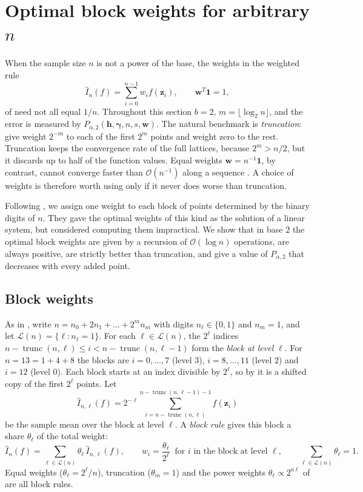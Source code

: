 \documentclass[preprint,12pt,authoryear]{elsarticle}
\begin{document}
 

\section{Optimal block weights for arbitrary $n$}\label{sec:bw}

When the sample size $n$ is not a power of the base, the weights in the
weighted rule
\[
 \widehat I_n(f)=\sum_{i=0}^{n-1}w_if(\boldsymbol z_i),\qquad
 \boldsymbol w^T\boldsymbol 1=1,
\]
of \citet[Section~5.1]{MDH26} need not all equal $1/n$. Throughout this
section $b=2$, $m=\lfloor\log_2n\rfloor$, and the error is measured by
$P_{\alpha,2}(\boldsymbol h,\boldsymbol\gamma,n,s,\boldsymbol w)$. The
natural benchmark is \emph{truncation}: give weight $2^{-m}$ to each of the
first $2^m$ points and weight zero to the rest. Truncation keeps
the convergence rate of the full lattices, because $2^m>n/2$, but it
discards up to half of the function values. Equal weights
$\boldsymbol w=n^{-1}\boldsymbol 1$, by contrast, cannot converge faster
than $\mathcal O(n^{-1})$ along a sequence \citep[Proposition~1]{HKKN12}. A
choice of weights is therefore worth using only if it never does worse than
truncation.

Following \citet{HKKN12}, we assign one weight to each block of points
determined by the binary digits of $n$. They gave the optimal weights of
this kind as the solution of a linear system, but considered computing them
impractical. We show that in base $2$ the optimal block weights are given by
a recursion of $\mathcal O(\log n)$ operations, are always positive, are
strictly better than truncation, and give a value of $P_{\alpha,2}$ that
decreases with every added point.

\subsection{Block weights}\label{sec:bw-def}

As in \citet[Section~4]{MDH26}, write $n=n_0+2n_1+\dots+2^mn_m$ with digits
$n_\ell\in\{0,1\}$ and $n_m=1$, and let
$\mathcal L(n)=\{\ell:n_\ell=1\}$. For each $\ell\in\mathcal L(n)$, the
$2^\ell$ indices $n-\operatorname{trunc}(n,\ell)\le i<n-\operatorname{trunc}(n,\ell-1)$
form the \emph{block at level $\ell$}. For $n=13=1+4+8$ the blocks are
$i=0,\dots,7$ (level $3$), $i=8,\dots,11$ (level $2$) and $i=12$ (level
$0$). Each block starts at an index divisible by $2^\ell$, so by \citet[Eq.~(2)]{MDH26} it is a
shifted copy of the first $2^\ell$ points. Let
\[
 \widehat I_{n,\ell}(f)=2^{-\ell}\sum_{i=n-\operatorname{trunc}(n,\ell)}
 ^{n-\operatorname{trunc}(n,\ell-1)-1}f(\boldsymbol z_i)
\]
be the sample mean over the block at level $\ell$. A \emph{block rule}
gives this block a share $\theta_\ell$ of the total weight:
\begin{equation}\label{eq:bw-weights}
 \widehat I_n(f)=\sum_{\ell\in\mathcal L(n)}\theta_\ell\,\widehat I_{n,\ell}(f),
 \qquad w_i=\frac{\theta_\ell}{2^\ell}\ \text{ for $i$ in the block at level $\ell$},
 \qquad \sum_{\ell\in\mathcal L(n)}\theta_\ell=1 .
\end{equation}
Equal weights ($\theta_\ell=2^\ell/n$), truncation ($\theta_m=1$) and the
power weights $\theta_\ell\propto2^{a\ell}$ of \citet{HKKN12} are all block
rules.
\end{document}
